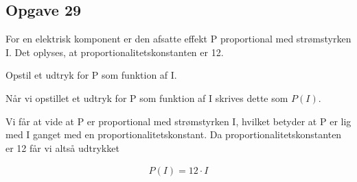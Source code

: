 \subsection{Opgave 29}

For en elektrisk komponent er den afsatte effekt P proportional med strømstyrken I. Det oplyses, at
proportionalitetskonstanten er 12.

Opstil et udtryk for P som funktion af I.

\ans

Når vi opstillet et udtryk for P som funktion af I skrives dette som
$P(I)$. 

Vi får at vide at P er proportional med strømstyrken I, hvilket betyder at P er lig med I
ganget med en proportionalitetskonstant. Da proportionalitetskonstanten er 12 får vi altså udtrykket

\begin{align*}
    P(I) = 12\cdot I
\end{align*}